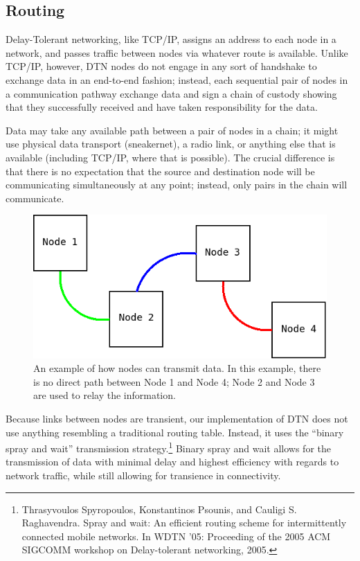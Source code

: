\documentclass[12pt]{article}
\begin{document}
  \subsection{Routing}
  \label{subsec:routing}
  
    Delay-Tolerant networking, like TCP/IP, assigns an address to each node in a network, and passes traffic between nodes via whatever route is available. Unlike TCP/IP, however, DTN nodes do not engage in any sort of handshake to exchange data in an end-to-end fashion; instead, each sequential pair of nodes in a communication pathway exchange data and sign a chain of custody showing that they successfully received and have taken responsibility for the data.
    
    Data may take any available path between a pair of nodes in a chain; it might use physical data transport (sneakernet), a radio link, or anything else that is available (including TCP/IP, where that is possible). The crucial difference is that there is no expectation that the source and destination node will be communicating simultaneously at any point; instead, only pairs in the chain will communicate.
    
    \begin{figure}[h]
      \centering
      \includegraphics[scale=0.5]{Diagram1.png}
      \caption{An example of how nodes can transmit data. In this example, there is no direct path between Node 1 and Node 4; Node 2 and Node 3 are used to relay the information.}
    \end{figure}
    
    Because links between nodes are transient, our implementation of DTN does not use anything resembling a traditional routing table. Instead, it uses the ``binary spray and wait'' transmission strategy.\footnote{Thrasyvoulos Spyropoulos, Konstantinos Psounis, and Cauligi S. Raghavendra. Spray and wait: An efficient routing scheme for intermittently connected mobile networks. In WDTN '05: Proceeding of the 2005 ACM SIGCOMM workshop on Delay-tolerant networking, 2005.} Binary spray and wait allows for the transmission of data with minimal delay and highest efficiency with regards to network traffic, while still allowing for transience in connectivity.
    
\end{document}
